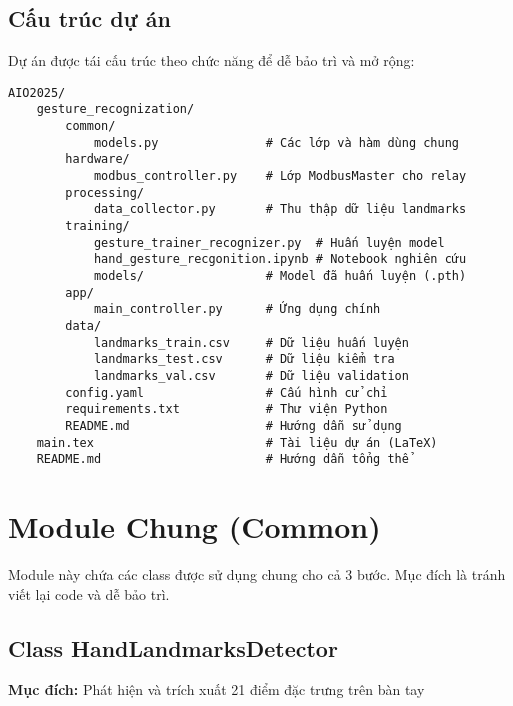 \subsection{Cấu trúc dự án}
Dự án được tái cấu trúc theo chức năng để dễ bảo trì và mở rộng:

\begin{verbatim}
AIO2025/
    gesture_recognization/
        common/
            models.py               # Các lớp và hàm dùng chung
        hardware/
            modbus_controller.py    # Lớp ModbusMaster cho relay
        processing/
            data_collector.py       # Thu thập dữ liệu landmarks
        training/
            gesture_trainer_recognizer.py  # Huấn luyện model
            hand_gesture_recgonition.ipynb # Notebook nghiên cứu
            models/                 # Model đã huấn luyện (.pth)
        app/
            main_controller.py      # Ứng dụng chính
        data/
            landmarks_train.csv     # Dữ liệu huấn luyện
            landmarks_test.csv      # Dữ liệu kiểm tra
            landmarks_val.csv       # Dữ liệu validation
        config.yaml                 # Cấu hình cử chỉ
        requirements.txt            # Thư viện Python
        README.md                   # Hướng dẫn sử dụng
    main.tex                        # Tài liệu dự án (LaTeX)
    README.md                       # Hướng dẫn tổng thể
\end{verbatim}



\section{Module Chung (Common)}

Module này chứa các class được sử dụng chung cho cả 3 bước. Mục đích là tránh viết lại code và dễ bảo trì.

\subsection{Class HandLandmarksDetector}
\textbf{Mục đích:} Phát hiện và trích xuất 21 điểm đặc trưng trên bàn tay

